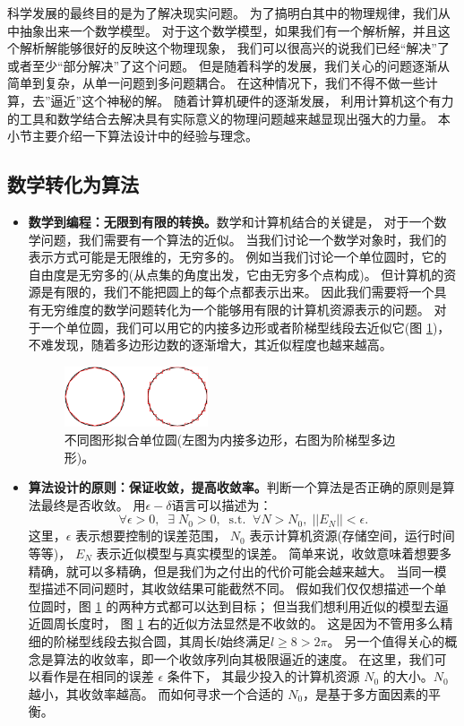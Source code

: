 
科学发展的最终目的是为了解决现实问题。
为了搞明白其中的物理规律，我们从中抽象出来一个数学模型。
对于这个数学模型，如果我们有一个解析解，并且这个解析解能够很好的反映这个物理现象，
我们可以很高兴的说我们已经“解决”了或者至少“部分解决”了这个问题。
但是随着科学的发展，我们关心的问题逐渐从简单到复杂，从单一问题到多问题耦合。
在这种情况下，我们不得不做一些计算，去”逼近”这个神秘的解。
随着计算机硬件的逐渐发展，
利用计算机这个有力的工具和数学结合去解决具有实际意义的物理问题越来越显现出强大的力量。
本小节主要介绍一下算法设计中的经验与理念。

\subsection{数学转化为算法}
\begin{itemize}
\item \textbf{数学到编程：无限到有限的转换。}数学和计算机结合的关键是，
  对于一个数学问题，我们需要有一个算法的近似。
  当我们讨论一个数学对象时，我们的表示方式可能是无限维的，无穷多的。
  例如当我们讨论一个单位圆时，它的自由度是无穷多的(从点集的角度出发，它由无穷多个点构成)。
  但计算机的资源是有限的，我们不能把圆上的每个点都表示出来。
  因此我们需要将一个具有无穷维度的数学问题转化为一个能够用有限的计算机资源表示的问题。
  对于一个单位圆，我们可以用它的内接多边形或者阶梯型线段去近似它(图 \ref{fig:circle})，
  不难发现，随着多边形边数的逐渐增大，其近似程度也越来越高。
  \begin{figure}[htbp]
    \centering
    \includegraphics[width=0.40\textwidth]{eps/circle}
    \caption{ 不同图形拟合单位圆(左图为内接多边形，右图为阶梯型多边形)。\label{fig:circle}}
  \end{figure}		
\item \textbf{算法设计的原则：保证收敛，提高收敛率。}判断一个算法是否正确的原则是算法最终是否收敛。
  用$\epsilon-\delta$语言可以描述为：
  \begin{equation}
    \label{epsDel}
    \forall \epsilon >0, \;\; \exists \; N_0>0, \;\;\text{s.t.} \;\;
    \forall N > N_0, \;||E_N|| < \epsilon.
  \end{equation}
  这里，$\epsilon$ 表示想要控制的误差范围，
  $N_0$ 表示计算机资源(存储空间，运行时间等等)，
  $E_N$ 表示近似模型与真实模型的误差。
  简单来说，收敛意味着想要多精确，就可以多精确，但是我们为之付出的代价可能会越来越大。
  当同一模型描述不同问题时，其收敛结果可能截然不同。
  假如我们仅仅想描述一个单位圆时，图 \ref{fig:circle} 的两种方式都可以达到目标；
  但当我们想利用近似的模型去逼近圆周长度时， 
  图 \ref{fig:circle} 右的近似方法显然是不收敛的。 
  这是因为不管用多么精细的阶梯型线段去拟合圆，其周长$l$始终满足$l \ge 8 > 2\pi$。
  另一个值得关心的概念是算法的收敛率，即一个收敛序列向其极限逼近的速度。
  在这里，我们可以看作是在相同的误差 $\epsilon$ 条件下，
  其最少投入的计算机资源 $N_0$ 的大小。$N_0$ 越小，其收敛率越高。
  而如何寻求一个合适的 $N_0$，是基于多方面因素的平衡。
\end{itemize}

